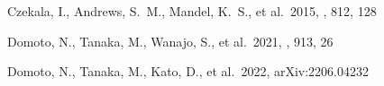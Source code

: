 \documentclass[twocolumn, twocolappendix]{aastex63}
\begin{document}
\begin{thebibliography}{}
 Czekala, I., Andrews, S.~M., Mandel, K.~S., et al.\ 2015, \apj, 812, 128








 Domoto, N., Tanaka, M., Wanajo, S., et al.\ 2021, \apj, 913, 26


 Domoto, N., Tanaka, M., Kato, D., et al.\ 2022, arXiv:2206.04232























\end{thebibliography}
\end{document}
